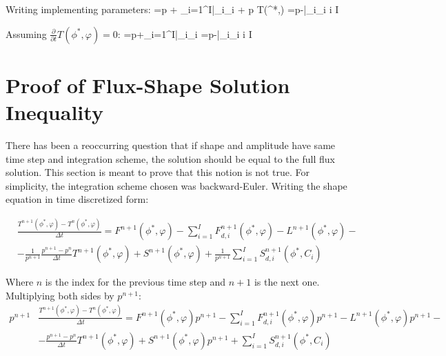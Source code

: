 Writing implementing parameters:
\be
{}=\left[\frac{\rho-\bar{\beta}}{\Lambda}\right]p + \sum_{i=1}^I\bar{\lambda}_i\xi_i + p T(\phi^{*},\varphi)
\ee
\be
{}=p-\bar{\lambda}_i\xi_i  \le i \le I 
\ee

Assuming $\frac{\partial}{\partial t} T(\phi^{*},\varphi) = 0$:
\be
{}=\left[\frac{\rho-\bar{\beta}}{\Lambda}\right]p+\sum_{i=1}^I\bar{\lambda}_i\xi_i
\label{eq:p}
\ee
\be
{}=p-\bar{\lambda}_i\xi_i  \le i \le I 
\label{eq:xi}
\ee

\section{Proof of Flux-Shape Solution Inequality}

There has been a reoccurring question that if shape and amplitude have same time step and integration scheme, the solution should be equal to the full flux solution.  This section is meant to prove that this notion is not true.  For simplicity, the integration scheme chosen was backward-Euler.  Writing the shape equation in time discretized form:

\begin{align}
&\frac{T^{n+1}(\phi^{*},\varphi)-T^{n}(\phi^{*},\varphi)}{\Delta t} = F^{n+1}(\phi^{*},\varphi) - \sum_{i=1}^I F_{d,i}^{n+1}(\phi^{*},\varphi) - L^{n+1}(\phi^{*},\varphi) -  \nonumber \\
&- \frac{1}{p^{n+1}}\frac{p^{n+1} - p^n}{\Delta t}T^{n+1}(\phi^{*},\varphi) + S^{n+1}(\phi^{*},\varphi) + \frac{1}{p^{n+1}}\sum_{i=1}^I S_{d,i}^{n+1}(\phi^{*},C_i)
\end{align}

Where $n$ is the index for the previous time step and $n+1$ is the next one.  Multiplying both sides by $p^{n+1}$:
\begin{align}
p^{n+1}&\frac{T^{n+1}(\phi^{*},\varphi)-T^{n}(\phi^{*},\varphi)}{\Delta t} = F^{n+1}(\phi^{*},\varphi)p^{n+1} - \sum_{i=1}^I F_{d,i}^{n+1}(\phi^{*},\varphi)p^{n+1} - L^{n+1}(\phi^{*},\varphi)p^{n+1} -  \nonumber \\
&- \frac{p^{n+1} - p^n}{\Delta t}T^{n+1}(\phi^{*},\varphi) + S^{n+1}(\phi^{*},\varphi)p^{n+1} + \sum_{i=1}^I S_{d,i}^{n+1}(\phi^{*},C_i)
\end{align}

